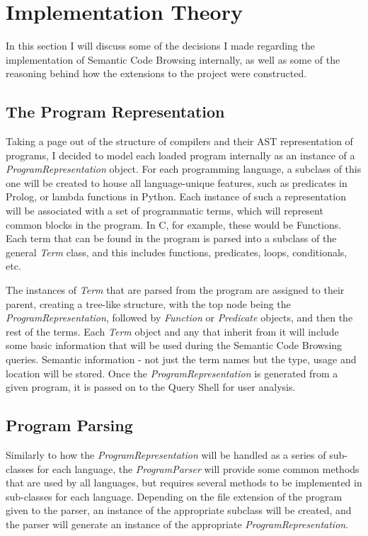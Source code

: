 \documentclass{article}
\begin{document}
\section{Implementation Theory}

In this section I will discuss some of the decisions I made regarding the implementation of Semantic Code Browsing internally, as well as some of the reasoning behind how the extensions to the project were constructed.

\subsection{The Program Representation}

Taking a page out of the structure of compilers and their AST representation of programs, I decided to model each loaded program internally as an instance of a \textit{ProgramRepresentation} object. For each programming language, a subclass of this one will be created to house all language-unique features, such as predicates in Prolog, or lambda functions in Python. Each instance of such a representation will be associated with a set of programmatic terms, which will represent common blocks in the program. In C, for example, these would be Functions. Each term that can be found in the program is parsed into a subclass of the general \textit{Term} class, and this includes functions, predicates, loops, conditionals, etc.

The instances of \textit{Term} that are parsed from the program are assigned to their parent, creating a tree-like structure, with the top node being the \textit{ProgramRepresentation}, followed by \textit{Function} or \textit{Predicate} objects, and then the rest of the terms. Each \textit{Term} object and any that inherit from it will include some basic information that will be used during the Semantic Code Browsing queries. Semantic information - not just the term names but the type, usage and location will be stored. Once the \textit{ProgramRepresentation} is generated from a given program, it is passed on to the Query Shell for user analysis.

\subsection{Program Parsing}

Similarly to how the \textit{ProgramRepresentation} will be handled as a series of sub-classes for each language, the \textit{ProgramParser} will provide some common methods that are used by all languages, but requires several methods to be implemented in sub-classes for each language. Depending on the file extension of the program given to the parser, an instance of the appropriate subclass will be created, and the parser will generate an instance of the appropriate \textit{ProgramRepresentation}. 
\end{document}
